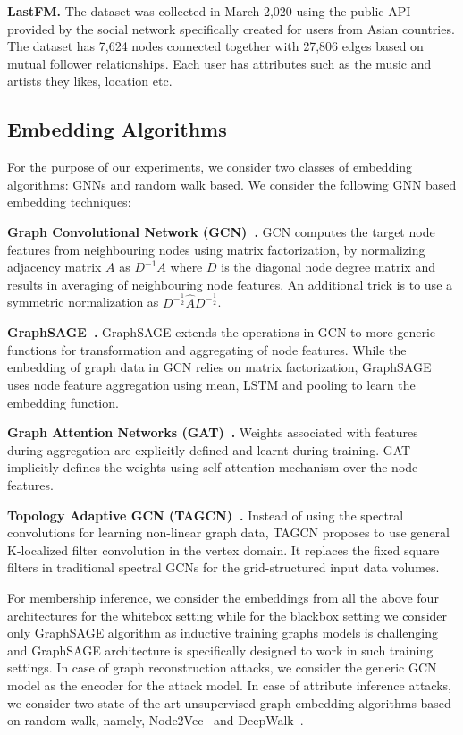 \noindent\textbf{LastFM.} The dataset was collected in March 2,020 using the public API provided by the social network specifically created for users from Asian countries.
The dataset has 7,624 nodes connected together with 27,806 edges based on mutual follower relationships.
Each user has attributes such as the music and artists they likes, location etc.


\subsection{Embedding Algorithms}


\noindent For the purpose of our experiments, we consider two classes of embedding algorithms: GNNs and random walk based.
We consider the following GNN based embedding techniques:

\noindent\textbf{Graph Convolutional Network (GCN)~\cite{Kipf2016tc}.} GCN computes the target node features from neighbouring nodes using matrix factorization, by normalizing adjacency matrix $A$ as $D^{-1}A$ where $D$ is the diagonal node degree matrix and results in averaging of neighbouring node features.
An additional trick is to use a symmetric normalization as $D^{-\frac{1}{2}}\hat{A}D^{-\frac{1}{2}}$.

\noindent\textbf{GraphSAGE~\cite{NIPS20176703}.} GraphSAGE extends the operations in GCN to more generic functions for transformation and aggregating of node features.
While the embedding of graph data in GCN relies on matrix factorization, GraphSAGE uses node feature aggregation using mean, LSTM and pooling to learn the embedding function.

\noindent\textbf{Graph Attention Networks (GAT)~\cite{velickovic2018graph}.} %
Weights associated with features during aggregation are explicitly defined and learnt during training.
GAT implicitly defines the weights using self-attention mechanism over the node features.

\noindent\textbf{Topology Adaptive GCN (TAGCN)~\cite{du2018topology}.} Instead of using the spectral convolutions for learning non-linear graph data, TAGCN proposes to use general K-localized filter convolution in the vertex domain.
It replaces the fixed square filters in traditional spectral GCNs for the grid-structured input data volumes.



\noindent For membership inference, we consider the embeddings from all the above four architectures for the whitebox setting while for the blackbox setting we consider only GraphSAGE algorithm as inductive training graphs models is challenging and GraphSAGE architecture is specifically designed to work in such training settings.
In case of graph reconstruction attacks, we consider the generic GCN model as the encoder for the attack model.
In case of attribute inference attacks, we consider two state of the art unsupervised graph embedding algorithms based on random walk, namely, Node2Vec~\cite{node2vec} and DeepWalk~\cite{deepwalk}.

